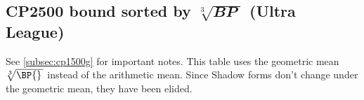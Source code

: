 \subsection[CP2500 bound sorted by \protect{$\sqrt[3]{\BP\,}$} (Ultra League)]%
{CP2500 bound sorted by $\sqrt[3]{\mathbfit{BP}\;}$ (Ultra League)\label{subsec:cp2500g}}
See \autoref{subsec:cp1500g} for important notes.
This table uses the geometric mean $\sqrt[3]{\BP{}\,}$ instead of the arithmetic mean.
Since Shadow forms don't change under the geometric mean, they have been elided.

